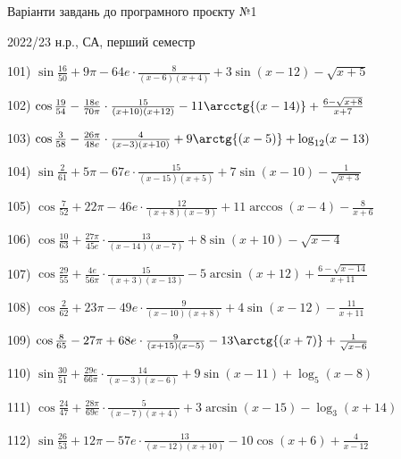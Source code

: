 \documentclass[11pt,ukrainian]{article}
\begin{document}
{\Large \center  Варіанти завдань до програмного проєкту №1\par 2022/23 н.р., СА, перший семестр\par \bigskip}
101) \space 
{ ${\sin\frac{16}{50}} + 9{\pi} - 64 e\cdot {\frac{8}{(x - 6)(x + 4)}} + {3\sin{(x - 12)}} - {\sqrt{x + 5}}$}
\smallskip\par
102) \space 
{ ${\cos\frac{19}{54}} - \frac{18 e}{70{\pi}}\cdot {\frac{15}{(x + 10)(x + 12)}} - {11\arcctg{(x - 14)}} + {\frac{6 - \sqrt{x + 8}}{x + 7}}$}
\smallskip\par
103) \space 
{ ${\cos\frac{3}{58}} - \frac{26{\pi}}{48 e}\cdot {\frac{4}{(x - 3)(x + 10)}} + {9\arctg{(x - 5)}} + {\log_{12}(x - 13)}$}
\smallskip\par
104) \space 
{ ${\sin\frac{2}{61}} + 5{\pi} - 67 e\cdot {\frac{15}{(x - 15)(x + 5)}} + {7\sin{(x - 10)}} - {\frac{1}{\sqrt{x + 3}}}$}
\smallskip\par
105) \space 
{ ${\cos\frac{7}{52}} + 22{\pi} - 46 e\cdot {\frac{12}{(x + 8)(x - 9)}} + {11\arccos{(x - 4)}} - { \frac{8}{x + 6}}$}
\smallskip\par
106) \space 
{ ${\cos\frac{10}{63}} + \frac{27{\pi}}{45 e}\cdot {\frac{13}{(x - 14)(x - 7)}} + {8\sin{(x + 10)}} - {\sqrt{x - 4}}$}
\smallskip\par
107) \space 
{ ${\cos\frac{29}{55}} + \frac{4 e}{56{\pi}}\cdot {\frac{15}{(x + 3)(x - 13)}} - {5\arcsin{(x + 12)}} + {\frac{6 - \sqrt{x - 14}}{x + 11}}$}
\smallskip\par
108) \space 
{ ${\cos\frac{2}{62}} + 23{\pi} - 49 e\cdot {\frac{9}{(x - 10)(x + 8)}} + {4\sin{(x - 12)}} - { \frac{11}{x + 11}}$}
\smallskip\par
109) \space 
{ ${\cos\frac{8}{65}} - 27{\pi} + 68 e\cdot {\frac{9}{(x + 15)(x - 5)}} - {13\arctg{(x + 7)}} + {\frac{1}{\sqrt{x - 6}}}$}
\smallskip\par
110) \space 
{ ${\sin\frac{30}{51}} + \frac{29 e}{66{\pi}}\cdot {\frac{14}{(x - 3)(x - 6)}} + {9\sin{(x - 11)}} + {\log_{5}(x - 8)}$}
\smallskip\par
111) \space 
{ ${\cos\frac{24}{47}} + \frac{28{\pi}}{69 e}\cdot {\frac{5}{(x - 7)(x + 4)}} + {3\arcsin{(x - 15)}} - {\log_{3}(x + 14)}$}
\smallskip\par
112) \space 
{ ${\sin\frac{26}{53}} + 12{\pi} - 57 e\cdot {\frac{13}{(x - 12)(x + 10)}} - {10\cos{(x + 6)}} + { \frac{4}{x - 12}}$}
\smallskip\par
\end{document}
